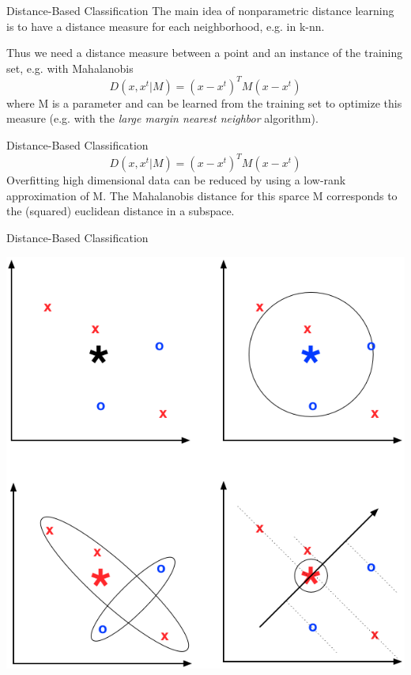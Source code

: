 \documentclass{beamer}
\begin{document}
\begin{frame}[fragile]{Distance-Based Classification}
The main idea of nonparametric distance learning is to have a distance measure for each neighborhood, e.g. in k-nn.

Thus we need a distance measure between a point and an instance of the training set, e.g. with Mahalanobis
\begin{equation}
	D(x,x^t|M)=(x-x^t)^{T}M(x-x^t)
\end{equation} 
where M is a parameter and can be learned from the training set to optimize this measure (e.g. with the \textit{large margin nearest neighbor} algorithm).
\end{frame}


\begin{frame}[fragile]{Distance-Based Classification}
  \begin{equation}
  	D(x,x^t|M)=(x-x^t)^{T}M(x-x^t)
  \end{equation} 
  Overfitting high dimensional data can be reduced by using a low-rank approximation of M. The Mahalanobis distance for this sparce M corresponds to the (squared) euclidean distance in a subspace.
\end{frame}

\begin{frame}[fragile]{Distance-Based Classification}
  \begin{center}
    \includegraphics[height=0.9\textheight]{images/distancestuff.png}
  \end{center}
\end{frame}
\end{document}
